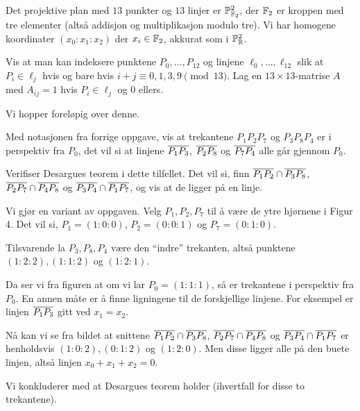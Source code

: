 \documentclass[11pt, norsk]{article}
\begin{document}
\begin{oppg}
 Det projektive plan med $13$ punkter og $13$ linjer er $\mathbb{P}_{\mathbb{F}_2}^2$, der $\mathbb{F}_2$ er kroppen med tre elementer (altså addisjon og multiplikasjon modulo tre). Vi har homogene koordinater $(x_0:x_1:x_2)$ der $x_i \in \mathbb{F}_2$, akkurat som i $\mathbb{P}_{\mathbb{R}}^2$.

Vis at man kan indeksere punktene $P_0,\ldots, P_{12}$ og linjene $\ell_0,\ldots,\ell_{12}$ slik at $P_i \in \ell_j$ hvis og bare hvis $i + j \equiv 0,1,3,9 \pmod{13}$. Lag en $13 \times 13$-matrise $A$ med $A_{ij}=1$ hvis $P_i \in \ell_j$ og $0$ ellers.
\end{oppg}
\begin{losn}
  Vi hopper foreløpig over denne.
\end{losn}

\begin{oppg}
  Med notasjonen fra forrige oppgave, vis at trekantene $P_1P_2P_7$ og $P_3P_8P_4$ er i perspektiv fra $P_0$, det vil si at linjene $\overline{P_1P_3}$, $\overline{P_2P_8}$ og $\overline{P_7 P_4}$ alle går gjennom $P_0$. 

Verifiser Desargues teorem i dette tilfellet. Det vil si, finn $\overline{P_1P_2} \cap \overline{P_3 P_8}$, $\overline{P_2 P_7} \cap \overline{P_4P_8}$ og $\overline{P_3P_4} \cap \overline{P_1P_7}$, og vis at de ligger på en linje.
\end{oppg}
\begin{losn}
Vi gjør en variant av oppgaven. Velg $P_1,P_2,P_7$ til å være de ytre hjørnene i Figur 4. Det vil si, $P_1=(1:0:0)$, $P_2=(0:0:1)$ og $P_7=(0:1:0)$. 

Tilsvarende la $P_3,P_8,P_4$ være den ``indre'' trekanten, altså punktene $(1:2:2),(1:1:2)$ og $(1:2:1)$. 

Da ser vi fra figuren at om vi lar $P_0=(1:1:1)$, så er trekantene i perspektiv fra $P_0$. En annen måte er å finne ligningene til de forskjellige linjene. For eksempel er linjen $\overline{P_1P_3}$ gitt ved $x_1=x_2$.

Nå kan vi se fra bildet at snittene $\overline{P_1P_2} \cap \overline{P_3P_8}$, $\overline{P_2 P_7} \cap \overline{P_4P_8}$ og $\overline{P_3P_4} \cap \overline{P_1P_7}$ er henholdsvis $(1:0:2), (0:1:2)$ og $(1:2:0)$. Men disse ligger alle på den buete linjen, altså linjen $x_0+x_1+x_2=0$.

Vi konkluderer med at Desargues teorem holder (ihvertfall for disse to trekantene).
\end{losn}
\end{document}
